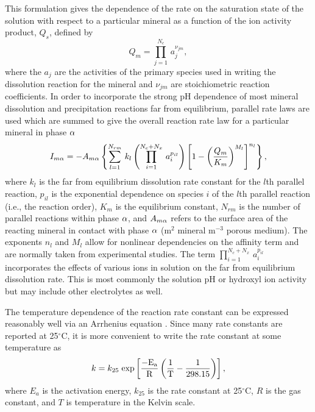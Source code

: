 This formulation gives the dependence of the rate on the saturation state of the solution with respect to a particular mineral as a function of the ion activity product, $Q_{s} $, defined by 
\begin{equation} \label{eq:Mineral3}  
  Q_{m} =\prod _{j=1}^{N_{c} } \, a_{j}^{\nu _{jm} } , 
\end{equation} 
where the $a_{j} $ are the activities of the primary species used in writing the dissolution reaction for the mineral and $\nu _{jm}$ are stoichiometric reaction coefficients. In order to incorporate the strong pH dependence of most mineral dissolution and precipitation reactions far from equilibrium, parallel rate laws are used which are summed to give the overall reaction rate law for a particular mineral in phase ${\alpha}$
\begin{equation} \label{eq:Mineral4} 
  I_{m{\alpha}} =-A_{m{\alpha}} \left\{ \sum _{l=1}^{N_{rm} } \, k_{l} 
  \left(\prod _{i=1}^{N_{c} +N_{x} } \, a_{i}^{p_{il} } \right) 
  \mathop{\left[1-\mathop{\left(\frac{Q_{m} }{K_{m} } \right)}
  \nolimits^{M_l} \right]}\nolimits^{n_l} \right\} , 
\end{equation} 
where $k_{l} $ is the far from equilibrium dissolution rate constant for the $l$th parallel reaction, $p_{il}$ is the exponential dependence on species $i$ of the $l$th parallel reaction (i.e., the reaction order), $K_{m} $ is the equilibrium constant, $N_{rm}$ is the number of parallel reactions within phase ${\alpha}$, and $A_{m{\alpha}} $ refers to the surface area of the reacting mineral in contact with phase ${\alpha}$ (m$^2$ mineral m$^{-3}$ porous medium). The exponents $n_l$ and $M_l$ allow for nonlinear dependencies on the affinity term and are normally taken from experimental studies. The term $\prod _{i=1}^{N_{c} +N_{x} } \, a_{i}^{p_{il}} $ incorporates the effects of various ions in solution on the far from equilibrium dissolution rate. This is most commonly the solution pH or hydroxyl ion activity but may include other electrolytes as well.

The temperature dependence of the reaction rate constant can be expressed reasonably well via an Arrhenius equation \citep{lasaga_1984}. Since many rate constants are reported at 25$^{\circ } $C, it is more convenient to write the rate constant at some temperature as 
\begin{equation} \label{eq:Mineral5} 
  k=k_{25} \; \rm{exp} \left[ \frac{-E_{a} }{R} \left( \frac{1}{T} -\frac{1}{298.15} \right) \right], 
\end{equation} 
where $E_{a} $ is the activation energy, $k_{25} $ is the rate constant at 25$^{\circ } $C, $R$ is the gas constant, and $T$ is temperature in the Kelvin scale. 

